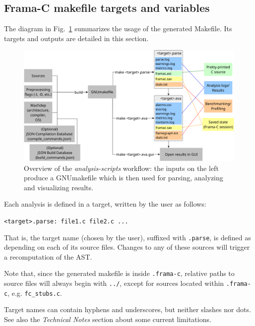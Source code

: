 \subsection*{Frama-C makefile targets and variables}

The diagram in Fig.~\ref{fig:analysis-scripts} summarizes the usage of
the generated Makefile. Its targets and outputs are detailed in this section.

\begin{figure}[htbp]
  \begin{center}
    \includegraphics[width=\textwidth]{analysis-scripts.pdf}
    \caption{Overview of the {\em analysis-scripts} workflow:
      the inputs on the left produce a GNUmakefile which is then used
      for parsing, analyzing and visualizing results.}
    \label{fig:analysis-scripts}
  \end{center}
\end{figure}

Each analysis is defined in a target, written by the user as follows:

\texttt{<target>.parse: file1.c file2.c ...}

That is, the target name (chosen by the user), suffixed with \texttt{.parse},
is defined as depending on each of its source files. Changes to any of these
sources will trigger a recomputation of the AST.

Note that, since the generated makefile is inside \texttt{.frama-c}, relative
paths to source files will always begin with \texttt{../}, except for
sources located within \texttt{.frama-c}, e.g. \texttt{fc\_stubs.c}.

\begin{important}
Target names can contain hyphens and underscores, but neither slashes nor dots.
See also the {\em Technical Notes} section about some current limitations.
\end{important}

